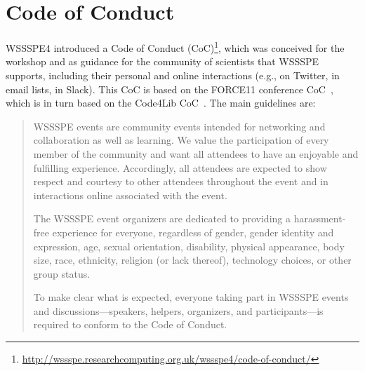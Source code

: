 \documentclass[11pt, oneside]{amsart}
\makeatletter
\newcommand\footnoteref[1]{\protected@xdef\@thefnmark{\ref{#1}}\@footnotemark}
\makeatother
\begin{document}
\section{Code of Conduct}\label{sec:CoC}

WSSSPE4 introduced a Code of Conduct (CoC)\footnote{\label{footnote:CoC}\url{http://wssspe.researchcomputing.org.uk/wssspe4/code-of-conduct/}}, which was conceived for the workshop and as guidance for the community of scientists that WSSSPE
supports, including their personal and online interactions (e.g., on
Twitter, in email lists, in Slack). This CoC is based on the
FORCE11 conference CoC~\cite{FORCE11:CoC}, which is in turn based on the Code4Lib
CoC~\cite{Code4Lib:CoC}.
The main guidelines are:
\begin{quote}
    WSSSPE events are community events intended for networking and collaboration
    as well as learning. We value the participation of every member of the
    community and want all attendees to have an enjoyable and fulfilling
    experience. Accordingly, all attendees are expected to show respect and
    courtesy to other attendees throughout the event and in interactions online
    associated with the event.

    The WSSSPE event organizers are dedicated to providing a harassment-free
    experience for everyone, regardless of gender, gender identity and
    expression, age, sexual orientation, disability, physical appearance,
    body size, race, ethnicity, religion (or lack thereof), technology choices,
    or other group status.

    To make clear what is expected, everyone taking part in WSSSPE events and
    discussions---speakers, helpers, organizers, and participants---is required
    to conform to the Code of Conduct\footnoteref{footnote:CoC}.



 \end{quote}
\end{document}
